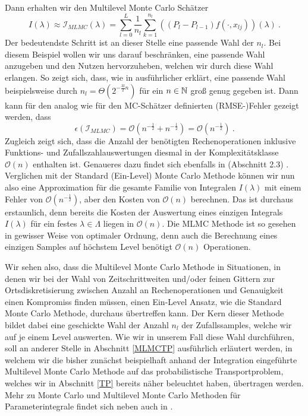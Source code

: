 \begin{Beispiel}
	  Dann erhalten wir den Multilevel Monte Carlo Schätzer 
	  \[
	   I(\lambda) \approx \mathcal{I}_{MLMC}(\lambda) = \sum_{l=0}^{L} \frac{1}{n_l} \sum_{k=1}^{n_l} ((P_l - P_{l-1}) f(\cdot,x_{lj}))(\lambda) \ .
	  \]
	  Der bedeutendste Schritt ist an dieser Stelle eine passende Wahl der $ n_l $. Bei diesem Beispiel wollen wir uns darauf beschränken, eine passende Wahl anzugeben und den Nutzen hervorzuheben, welchen wir durch diese Wahl erlangen. So zeigt sich, dass, wie in \cite{heinrich2001multilevel} ausführlicher erklärt, eine passende Wahl beispielsweise durch $ n_l = \Theta(2^{-\frac{3l}{2}n})$ für ein $ n \in \mathbb{N} $ groß genug gegeben ist. 
	  Dann kann für den analog wie für den MC-Schätzer definierten (RMSE-)Fehler gezeigt werden, dass 
	  \[
	  	\epsilon(\mathcal{I}_{MLMC}) = \mathcal{O}(n^{-\frac{1}{2}} + n^{-\frac{1}{2}}) = \mathcal{O}(n^{-\frac{1}{2}}) \ .
	  \]
	  Zugleich zeigt sich, dass die Anzahl der benötigten Rechenoperationen inklusive Funktions- und Zufallszahlauswertungen diesmal in der Komplexitätsklasse $ \mathcal{O}(n) $ enthalten ist. Genaueres dazu findet sich ebenfalls in \cite{heinrich2001multilevel} (Abschnitt 2.3) .
	  Verglichen mit der Standard (Ein-Level) Monte Carlo Methode können wir nun also eine Approximation für die gesamte Familie von Integralen $ I(\lambda) $ mit einem Fehler von $ \mathcal{O}(n^{-\frac{1}{2}}) $, aber den Kosten von $ \mathcal{O}(n) $  berechnen. Das ist durchaus erstaunlich, denn bereits die Kosten der Auswertung eines einzigen Integrals $ I(\lambda) $ für ein festes $ \lambda \in \Lambda $ liegen in $ \mathcal{O}(n) $. Die MLMC Methode ist so gesehen in gewisser Weise von optimaler Ordnung, denn auch die Berechnung eines einzigen Samples auf höchstem Level benötigt $ \mathcal{O}(n)  $ Operationen.
\end{Beispiel}

Wir sehen also, dass die Multilevel Monte Carlo Methode in Situationen, in denen wir bei der Wahl von Zeitschrittweiten und/oder feinen Gittern zur Ortsdiskretisierung zwischen Anzahl an Rechenoperationen und Genauigkeit einen Kompromiss finden müssen, einen Ein-Level Ansatz, wie die Standard Monte Carlo Methode, durchaus übertreffen kann.
Der Kern dieser Methode bildet dabei eine geschickte Wahl der Anzahl $ n_l $ der Zufallssamples, welche wir auf je einem Level auswerten. Wie wir in unserem Fall diese Wahl durchführen, soll an anderer Stelle in Abschnitt \ref{MLMCTP} ausführlich erläutert werden, in welchem wir die bisher zunächst beispielhaft anhand der Integration eingeführte Multilevel Monte Carlo Methode auf das probabilistische Transportproblem, welches wir in Abschnitt \ref{TP} bereits näher beleuchtet haben, übertragen werden.
Mehr zu Monte Carlo und Multilevel Monte Carlo Methoden für Parameterintegrale findet sich neben \cite{heinrich2001multilevel} auch in \cite{heinrich1992random}.

